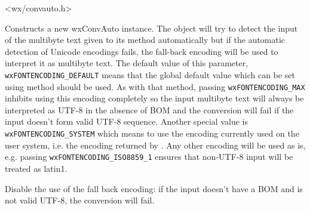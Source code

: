 


<wx/convauto.h>







\label{wxconvautowxconvauto}


Constructs a new wxConvAuto instance. The object will try to detect the input
of the multibyte text given to its  method
automatically but if the automatic detection of Unicode encodings fails, the
fall-back encoding  will be used to interpret it as multibyte text.
The default value of this parameter, \texttt{wxFONTENCODING\_DEFAULT} means
that the global default value which can be set using
 method should be
used. As with that method, passing \texttt{wxFONTENCODING\_MAX} inhibits using
this encoding completely so the input multibyte text will always be interpreted
as UTF-8 in the absence of BOM and the conversion will fail if the input
doesn't form valid UTF-8 sequence. Another special value is
\texttt{wxFONTENCODING\_SYSTEM} which means to use the encoding currently used
on the user system, i.e. the encoding returned by
. Any other
encoding will be used as is, e.g. passing \texttt{wxFONTENCODING\_ISO8859\_1} 
ensures that non-UTF-8 input will be treated as latin1.


\label{wxconvautodisablefallbackencoding}


Disable the use of the fall back encoding: if the input doesn't have a BOM and
is not valid UTF-8, the conversion will fail.


\label{wxconvautogetdefaultmbencoding}


